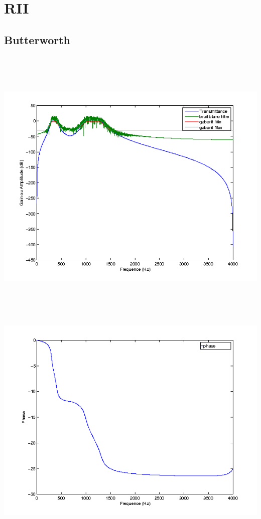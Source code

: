 \documentclass{article}
\begin{document}
\section{RII}
\subsection{Butterworth}

\inputminted[linenos,lastline=25]{matlab}{RII_butter.m}
\includegraphics[height=13cm]{butt_1}
\inputminted[linenos,firstnumber=29,firstline=29,lastline=29]{matlab}{RII_butter.m}
\includegraphics[height=10cm]{butt_2}
\end{document}
